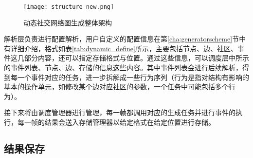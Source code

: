 
\begin{figure}
  \centering
  \texttt{[image: structure\_new.png]}
  \caption{动态社交网络图生成整体架构}
  \label{fig:structure}
\end{figure}

解析层负责进行配置解析，用户自定义的配置信息在第\ref{cha:generatorscheme}节中有详细介绍，格式如表\ref{tab:dynamic_define}所示，主要包括节点、边、社区、事件这几部分内容，还可以指定存储格式与位置。通过这些信息，可以调度层中所示的事件列表、节点、边、存储的信息这些内容。其中事件列表会进行后续解析，得到每一个事件对应的任务，进一步拆解成一些行为序列（行为是指对结构有影响的基本的操作单元，如修改某个边对应社区的参数，一个任务中可能包括多个行为）。

接下来将由调度管理器进行管理，每一帧都调用对应的生成任务并进行事件的执行，每一帧的结果会送入存储管理器以给定格式在给定位置进行存储。

\subsection{结果保存}

